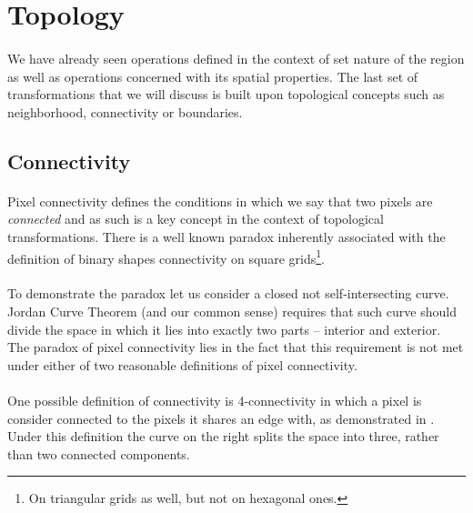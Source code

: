 \section{Topology}

\paragraph*{}
We have already seen operations defined in the context of set nature of the region as well as operations concerned with its spatial properties. The last set of transformations that we will discuss is built upon topological concepts such as neighborhood, connectivity or boundaries.

\subsection{Connectivity}

\paragraph*{}
Pixel connectivity defines the conditions in which we say that two pixels are \textit{connected} and as such is a key concept in the context of topological transformations. There is a well known paradox inherently associated with the definition of binary shapes connectivity on square grids\footnote{On triangular grids as well, but not on hexagonal ones.}.

\paragraph*{}
To demonstrate the paradox let us consider a closed not self-intersecting curve. Jordan Curve Theorem (and our common sense) requires that such curve should divide the space in which it lies into exactly two parts -- interior and exterior. The paradox of pixel connectivity lies in the fact that this requirement is not met under either of two reasonable definitions of pixel connectivity.

\paragraph*{}
One possible definition of connectivity is 4-connectivity in which a pixel is consider connected to the pixels it shares an edge with, as demonstrated in . Under this definition the curve on the right splits the space into three, rather than two connected components.

